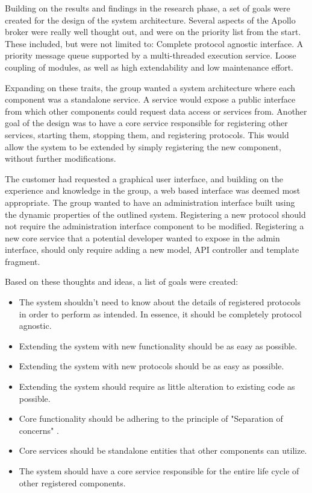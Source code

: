 Building on the results and findings in the research phase, a set of goals were created for the design of the system architecture. Several aspects of the Apollo broker were really well thought out, and were on the priority list from the start. These included, but were not limited to: Complete protocol agnostic interface. A priority message queue supported by a multi-threaded execution service. Loose coupling of modules, as well as high extendability and low maintenance effort.

Expanding on these traits, the group wanted a system architecture where each component was a standalone service. A service would expose a public interface from which other components could request data access or services from. Another goal of the design was to have a core service responsible for registering other services, starting them, stopping them, and registering protocols. This would allow the system to be extended by simply registering the new component, without further modifications.

The customer had requested a graphical user interface, and building on the experience and knowledge in the group, a web based interface was deemed most appropriate. The group wanted to have an administration interface built using the dynamic properties of the outlined system. Registering a new protocol should not require the administration interface component to be modified. Registering a new core service that a potential developer wanted to expose in the admin interface, should only require adding a new model, API controller and template fragment.

Based on these thoughts and ideas, a list of goals were created:

\begin{itemize}
\item The system shouldn't need to know about the details of registered protocols in order to perform as intended. In essence, it should be completely protocol agnostic.
\item Extending the system with new functionality should be as easy as possible.
\item Extending the system with new protocols should be as easy as possible.
\item Extending the system should require as little alteration to existing code as possible.
\item Core functionality should be adhering to the principle of "Separation of concerns" \cite{soc}.
\item Core services should be standalone entities that other components can utilize.
\item The system should have a core service responsible for the entire life cycle of other registered components.
\end{itemize}

